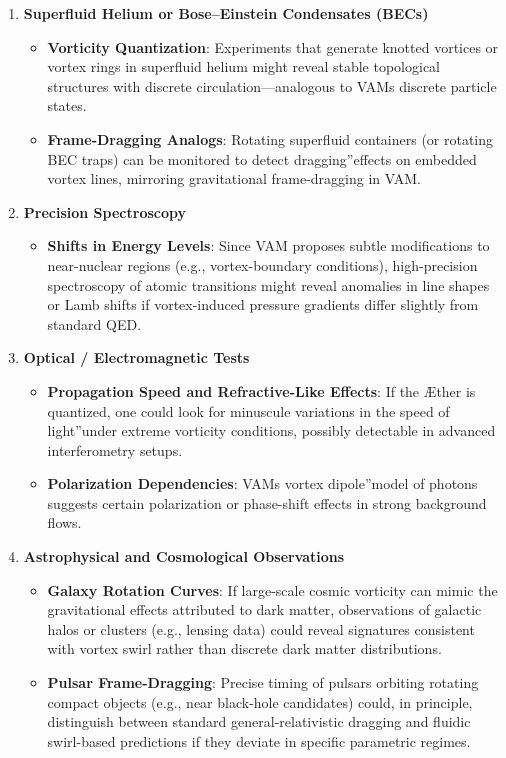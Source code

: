\begin{enumerate}
    \item \textbf{Superfluid Helium or Bose–Einstein Condensates (BECs)}
    \begin{itemize}
        \item \textbf{Vorticity Quantization}: Experiments that generate knotted vortices or vortex rings in superfluid helium might reveal stable topological structures with discrete circulation—analogous to VAM\rqs s discrete particle states.
        \item \textbf{Frame-Dragging Analogs}: Rotating superfluid containers (or rotating BEC traps) can be monitored to detect \grqq dragging\textquotedblright effects on embedded vortex lines, mirroring gravitational frame-dragging in VAM.
    \end{itemize}

    \item \textbf{Precision Spectroscopy}
    \begin{itemize}
        \item \textbf{Shifts in Energy Levels}: Since VAM proposes subtle modifications to near-nuclear regions (e.g., vortex-boundary conditions), high-precision spectroscopy of atomic transitions might reveal anomalies in line shapes or Lamb shifts if vortex-induced pressure gradients differ slightly from standard QED.
    \end{itemize}

    \item \textbf{Optical / Electromagnetic Tests}
    \begin{itemize}
        \item \textbf{Propagation Speed and Refractive-Like Effects}: If the Æther is quantized, one could look for minuscule variations in the \grqq speed of light\textquotedblright under extreme vorticity conditions, possibly detectable in advanced interferometry setups.
        \item \textbf{Polarization Dependencies}: VAM\rqs s vortex \grqq dipole\textquotedblright model of photons suggests certain polarization or phase-shift effects in strong background flows.
    \end{itemize}

    \item \textbf{Astrophysical and Cosmological Observations}
    \begin{itemize}
        \item \textbf{Galaxy Rotation Curves}: If large-scale cosmic vorticity can mimic the gravitational effects attributed to dark matter, observations of galactic halos or clusters (e.g., lensing data) could reveal signatures consistent with vortex swirl rather than discrete dark matter distributions.
        \item \textbf{Pulsar Frame-Dragging}: Precise timing of pulsars orbiting rotating compact objects (e.g., near black-hole candidates) could, in principle, distinguish between standard general-relativistic dragging and fluidic swirl-based predictions if they deviate in specific parametric regimes.
    \end{itemize}
\end{enumerate}

